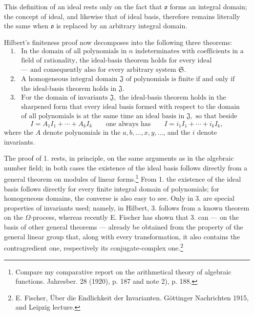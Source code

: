 \documentclass[11pt]{article}
\providecommand{\mJ}{\mathfrak J}
\providecommand{\mS}{\mathfrak S}
\providecommand{\mo}{\mathfrak o}
\begin{document}
This definition of an ideal rests only on the fact that $\mo$ forms an integral domain; the concept of ideal, and likewise that of ideal basis, therefore remains literally the same when $\mo$ is replaced by an arbitrary integral domain.

Hilbert's finiteness proof now decomposes into the following three theorems:
\[
\begin{array}{ll}
1.& \text{In the domain of all polynomials in }n\text{ indeterminates with coefficients in a}\\
& \text{field of rationality, the ideal-basis theorem holds for every ideal}\\
& \text{--- and consequently also for every arbitrary system }\mS.\\[2pt]
2.& \text{A homogeneous integral domain }\mJ\text{ of polynomials is finite if and only if}\\
& \text{the ideal-basis theorem holds in }\mJ.\\[2pt]
3.& \text{For the domain of invariants }\mJ,\text{ the ideal-basis theorem holds in the}\\
& \text{sharpened form that every ideal basis formed with respect to the domain}\\
& \text{of all polynomials is at the same time an ideal basis in }\mJ,\text{ so that beside}
\end{array}
\]
\[
 I=A_1I_1+\cdots+A_kI_k
 \qquad\text{one always has}\qquad
 I=i_1I_1+\cdots+i_kI_k,
\]
where the $A$ denote polynomials in the $a,b,\ldots,x,y,\ldots$, and the $i$ denote invariants.

The proof of 1. rests, in principle, on the same arguments as in the algebraic number field; in both cases the existence of the ideal basis follows directly from a general theorem on modules of linear forms.\footnote{Compare my comparative report on the arithmetical theory of algebraic functions. Jahresber. 28 (1920), p. 187 and note 2), p. 188.} From 1. the existence of the ideal basis follows directly for every finite integral domain of polynomials; for homogeneous domains, the converse is also easy to see. Only in 3. are special properties of invariants used; namely, in Hilbert, 3. follows from a known theorem on the $\Omega$-process, whereas recently E. Fischer has shown that 3. can --- on the basis of other general theorems --- already be obtained from the property of the general linear group that, along with every transformation, it also contains the contragredient one, respectively its conjugate-complex one.\footnote{E. Fischer, Über die Endlichkeit der Invarianten. Göttinger Nachrichten 1915, and Leipzig lecture.}
\end{document}
